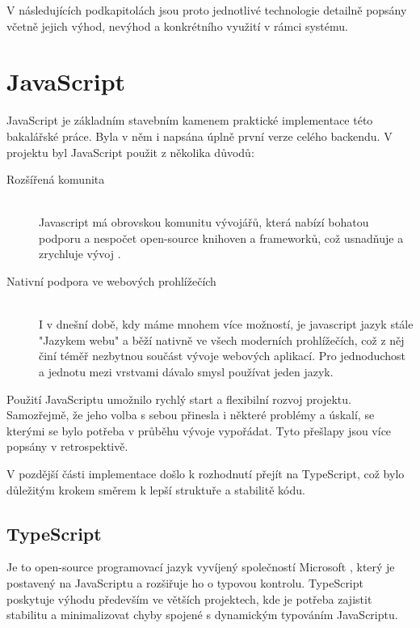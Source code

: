 V následujících podkapitolách jsou proto jednotlivé technologie detailně popsány včetně jejich výhod, nevýhod a konkrétního využití v rámci systému.

\section{JavaScript}
JavaScript je základním stavebním kamenem praktické implementace této bakalářské práce. Byla v něm i napsána úplně první verze celého backendu. V projektu byl JavaScript použit z několika důvodů:

\begin{description}
  \item[Rozšířená komunita] \hfill \\ Javascript má obrovskou komunitu vývojářů, která nabízí bohatou podporu a nespočet open-source knihoven a frameworků, což usnadňuje a zrychluje vývoj \cite{dev52MDevelopers}.
  \item[Nativní podpora ve webových prohlížečích] \hfill \\ I v dnešní době, kdy máme mnohem více možností, je javascript jazyk stále "Jazykem webu"\cite{ranjan2020javascript} a běží nativně ve všech moderních prohlížečích\cite{browserstackJavaScriptCode}, což z něj činí téměř nezbytnou součást vývoje webových aplikací. Pro jednoduchost a jednotu mezi vrstvami dávalo smysl používat jeden jazyk.
\end{description}

Použití JavaScriptu umožnilo rychlý start a flexibilní rozvoj projektu. Samozřejmě, že jeho volba s sebou přinesla i některé problémy a úskalí, se kterými se bylo potřeba v průběhu vývoje vypořádat. Tyto přešlapy jsou více popsány v retrospektivě.

V pozdější části implementace došlo k rozhodnutí přejít na TypeScript, což bylo důležitým krokem směrem k lepší struktuře a stabilitě kódu.

\subsection{TypeScript}
Je to open-source programovací jazyk vyvíjený společností Microsoft \cite{typescriptlangDocumentationTypeScript}, který je postavený na JavaScriptu a rozšiřuje ho o typovou kontrolu\cite{goldberg2022learning}. TypeScript poskytuje výhodu především ve větších projektech, kde je potřeba zajistit stabilitu a minimalizovat chyby spojené s dynamickým typováním JavaScriptu.

